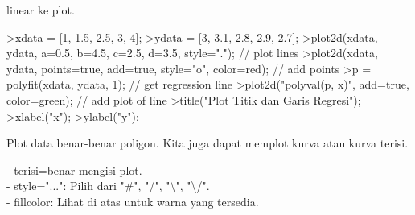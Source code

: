 \documentclass{article}
\begin{document}
\begin{eulernotebook}
\begin{eulercomment}
\begin{eulercomment}
\begin{eulercomment}
\begin{eulercomment}
\begin{eulercomment}
\begin{eulercomment}
\begin{eulercomment}
\begin{eulercomment}
\begin{eulercomment}
\begin{eulercomment}
\begin{eulercomment}
\begin{eulercomment}
\begin{eulercomment}
\begin{eulercomment}
\begin{eulercomment}
\begin{eulercomment}
\begin{eulercomment}
\begin{eulercomment}
\begin{eulercomment}
\begin{eulercomment}
\begin{eulercomment}
\begin{eulercomment}
\begin{eulercomment}
linear ke plot.\\
\end{eulercomment}
\eulersubheading{}
\begin{eulerprompt}
>xdata = [1, 1.5, 2.5, 3, 4];
>ydata = [3, 3.1, 2.8, 2.9, 2.7];
>plot2d(xdata, ydata, a=0.5, b=4.5, c=2.5, d=3.5, style="."); // plot lines
>plot2d(xdata, ydata, points=true, add=true, style="o", color=red); // add points
>p = polyfit(xdata, ydata, 1); // get regression line
>plot2d("polyval(p, x)", add=true, color=green); // add plot of line
>title("Plot Titik dan Garis Regresi");
>xlabel("x");
>ylabel("y"):
\end{eulerprompt}
\eulersubheading{}
\begin{eulercomment}
\begin{eulercomment}
\begin{eulercomment}
Plot data benar-benar poligon. Kita juga dapat memplot kurva atau
kurva terisi.

- terisi=benar mengisi plot.\\
- style="...": Pilih dari "#", "/", "\textbackslash{}", "\textbackslash{}/".\\
- fillcolor: Lihat di atas untuk warna yang tersedia.


\end{eulercomment}
\end{eulercomment}
\end{eulercomment}
\end{eulercomment}
\end{eulercomment}
\end{eulercomment}
\end{eulercomment}
\end{eulercomment}
\end{eulercomment}
\end{eulercomment}
\end{eulercomment}
\end{eulercomment}
\end{eulercomment}
\end{eulercomment}
\end{eulercomment}
\end{eulercomment}
\end{eulercomment}
\end{eulercomment}
\end{eulercomment}
\end{eulercomment}
\end{eulercomment}
\end{eulercomment}
\end{eulercomment}
\end{eulercomment}
\end{eulercomment}
\end{eulernotebook}
\end{document}
